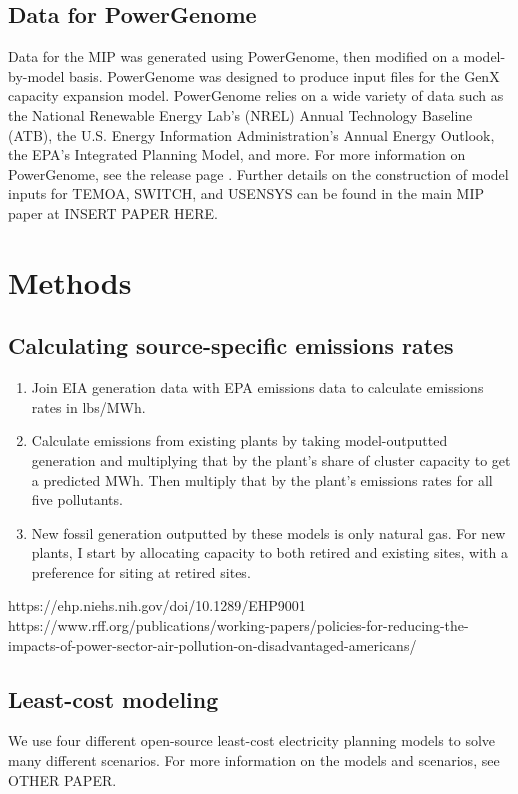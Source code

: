 \documentclass[a4paper]{article}
\theoremstyle{definition}
\theoremstyle{plain}
\begin{document}
\subsection{Data for PowerGenome}
Data for the MIP was generated using PowerGenome, then modified on a model-by-model basis.  PowerGenome was designed to produce input files for the GenX capacity expansion model.  PowerGenome relies on a wide variety of data such as the National Renewable Energy Lab's (NREL) Annual Technology Baseline (ATB), the U.S. Energy Information Administration's Annual Energy Outlook, the EPA's Integrated Planning Model, and more.  For more information on PowerGenome, see the release page \citep{PowerGenome/PowerGenome:V0.6.3}.  Further details on the construction of model inputs for TEMOA, SWITCH, and USENSYS can be found in the main MIP paper at INSERT PAPER HERE.

\section{Methods}

\subsection{Calculating source-specific emissions rates}
\begin{enumerate}
    \item Join EIA generation data with EPA emissions data to calculate emissions rates in lbs/MWh.
    \item Calculate emissions from existing plants by taking model-outputted generation and multiplying that by the plant's share of cluster capacity to get a predicted MWh.  Then multiply that by the plant's emissions rates for all five pollutants.
    \item New fossil generation outputted by these models is only natural gas.  For new plants, I start by allocating capacity to both retired and existing sites, with a preference for siting at retired sites.
\end{enumerate}

https://ehp.niehs.nih.gov/doi/10.1289/EHP9001
https://www.rff.org/publications/working-papers/policies-for-reducing-the-impacts-of-power-sector-air-pollution-on-disadvantaged-americans/

\subsection{Least-cost modeling}
We use four different open-source least-cost electricity planning models to solve many different scenarios. For more information on the models and scenarios, see OTHER PAPER.
\end{document}
